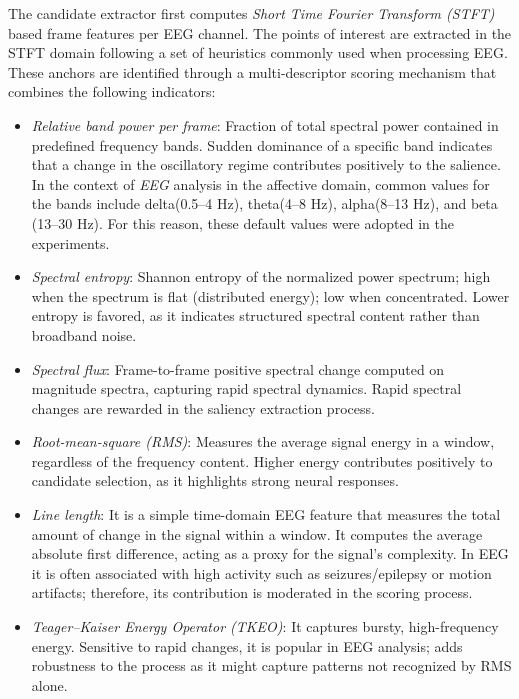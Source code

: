The candidate extractor first computes \textit{Short Time Fourier Transform (STFT)} based frame features per EEG channel.
The points of interest are extracted in the STFT domain following a set of heuristics commonly used when processing EEG.
These anchors are identified through a multi-descriptor scoring mechanism that combines the following indicators:
\begin{itemize}
    \item \textit{Relative band power per frame}: Fraction of total spectral power contained in predefined frequency bands.
    Sudden dominance of a specific band indicates that a change in the oscillatory regime contributes positively to the salience.
    In the context of \textit{EEG} analysis in the affective domain, common
    values for the bands include delta(0.5–4 Hz), theta(4–8 Hz), alpha(8–13 Hz), and beta (13–30 Hz).
    For this reason, these default values were adopted in the experiments. %

    \item \textit{Spectral entropy}: Shannon entropy of the normalized power spectrum; high when the spectrum is flat (distributed energy); low when concentrated.
    Lower entropy is favored, as it indicates structured spectral content rather than broadband noise.

    \item \textit{Spectral flux}: Frame-to-frame positive spectral change computed on magnitude spectra, capturing rapid spectral dynamics.
    Rapid spectral changes are rewarded in the saliency extraction process.

    \item \textit{Root-mean-square (RMS)}: Measures the average signal energy in a window, regardless of the frequency content.
    Higher energy contributes positively to candidate selection, as it highlights strong neural responses.

    \item \textit{Line length}: It is a simple time-domain EEG feature that measures the total amount of change in the signal within a window.
    It computes the average absolute first difference, acting as a proxy for the signal's complexity.
    In EEG it is often associated with high activity such as seizures/epilepsy or motion artifacts; therefore, its contribution is moderated in the scoring process.

    \item \textit{Teager–Kaiser Energy Operator (TKEO)}: It captures bursty, high-frequency energy.
    Sensitive to rapid changes, it is popular in EEG analysis; adds robustness to the process as it might capture patterns not recognized by RMS alone.
\end{itemize}

